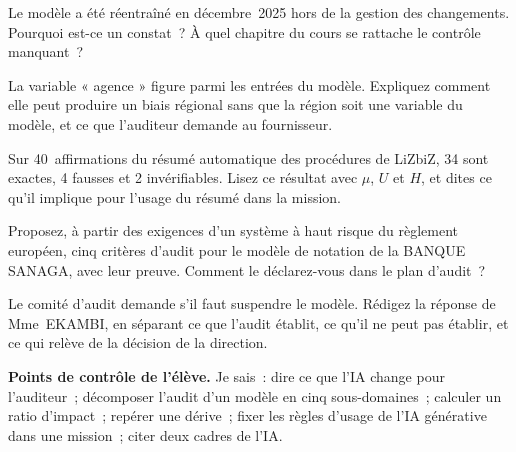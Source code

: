 \begin{boxexo}[title={\ding{45}\quad Exercice~28.6. Le réentraînement \niveaumoyen}]
Le modèle a été réentraîné en décembre~2025 hors de la gestion des
changements. Pourquoi est-ce un constat~? À quel chapitre du cours se
rattache le contrôle manquant~?
\end{boxexo}

\begin{boxexo}[title={\ding{45}\quad Exercice~28.7. Une variable suspecte \niveaumoyen}]
La variable « agence » figure parmi les entrées du modèle. Expliquez
comment elle peut produire un biais régional sans que la région soit une
variable du modèle, et ce que l'auditeur demande au fournisseur.
\end{boxexo}

\begin{boxexo}[title={\ding{45}\quad Exercice~28.8. Un résumé à vérifier \niveaumoyen}]
Sur 40~affirmations du résumé automatique des procédures de LiZbiZ, 34 sont
exactes, 4 fausses et 2 invérifiables. Lisez ce résultat avec $\mu$, $U$ et
$H$, et dites ce qu'il implique pour l'usage du résumé dans la mission.
\end{boxexo}

\begin{boxexo}[title={\ding{45}\quad Exercice~28.9. Un référentiel volontaire \niveauexpert}]
Proposez, à partir des exigences d'un système à haut risque du règlement
européen, cinq critères d'audit pour le modèle de notation de la BANQUE
SANAGA, avec leur preuve. Comment le déclarez-vous dans le plan d'audit~?
\end{boxexo}

\begin{boxexo}[title={\ding{45}\quad Exercice~28.10. Suspendre le modèle~? \niveauexpert}]
Le comité d'audit demande s'il faut suspendre le modèle. Rédigez la réponse
de Mme~EKAMBI, en séparant ce que l'audit établit, ce qu'il ne peut pas
établir, et ce qui relève de la décision de la direction.
\end{boxexo}

\bigskip

\begin{boxinfo}
\textbf{Points de contrôle de l'élève.} Je sais~: dire ce que l'IA change
pour l'auditeur~; décomposer l'audit d'un modèle en cinq sous-domaines~;
calculer un ratio d'impact~; repérer une dérive~; fixer les règles d'usage
de l'IA générative dans une mission~; citer deux cadres de l'IA.
\end{boxinfo}

